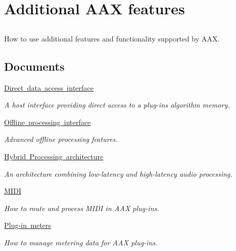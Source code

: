\hypertarget{a00802}{}\section{Additional A\+AX features}
\label{a00802}


\subsection{ }
How to use additional features and functionality supported by A\+AX. 

\subsection*{Documents}
\begin{DoxyCompactItemize}
\item 
\mbox{\hyperlink{a00803}{Direct data access interface}}
\begin{DoxyCompactList}\small\item\em A host interface providing direct access to a plug-\/in\textquotesingle{}s algorithm memory. \end{DoxyCompactList}\item 
\mbox{\hyperlink{a00804}{Offline processing interface}}
\begin{DoxyCompactList}\small\item\em Advanced offline processing features. \end{DoxyCompactList}\item 
\mbox{\hyperlink{a00805}{Hybrid Processing architecture}}
\begin{DoxyCompactList}\small\item\em An architecture combining low-\/latency and high-\/latency audio processing. \end{DoxyCompactList}\item 
\mbox{\hyperlink{a00806}{M\+I\+DI}}
\begin{DoxyCompactList}\small\item\em How to route and process M\+I\+DI in A\+AX plug-\/ins. \end{DoxyCompactList}\item 
\mbox{\hyperlink{a00807}{Plug-\/in meters}}
\begin{DoxyCompactList}\small\item\em How to manage metering data for A\+AX plug-\/ins. \end{DoxyCompactList}\item 

\end{DoxyCompactItemize}
